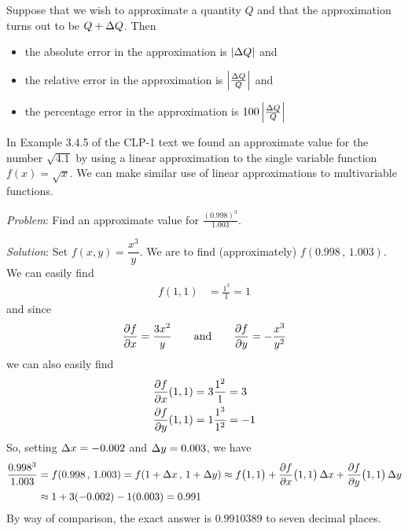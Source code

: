 \begin{defn}\label{def error}
Suppose that we wish to approximate a quantity $Q$ and that the
approximation turns out to be $Q+\Delta Q$. Then
\begin{itemize}\itemsep1pt \parskip0pt 
\item 
the absolute error in the approximation is $|\Delta Q|$ and
\item
the relative error in the approximation is $\left|\frac{\Delta Q}{Q}\right|$ and
\item
the percentage error in the approximation is
$100\left|\frac{\Delta Q}{Q}\right|$ 
\end{itemize}
\end{defn}

In Example 3.4.5 of the CLP-1 text we found an approximate
value for the number $\sqrt{4.1}$ by using a linear approximation
to the single variable function $f(x)=\sqrt{x}$. We can make similar use
of linear approximations to multivariable functions.

\begin{eg}\label{eg approx A}
\noindent\textit{Problem}:
Find an approximate value for $\frac{(0.998)^3}{1.003}$.

\medskip
\noindent\textit{Solution}:
Set $f(x,y) = \dfrac{x^3}{y}$. We are to find (approximately) 
$f(0.998\,,\,1.003)$. We can easily find
\begin{align*}
f(1,1) &= \frac{1^3}{1}=1
\end{align*}
and since 
\begin{equation*}
\pdiff{f}{x}=\frac{3x^2}{y}\qquad \text{and}\qquad 
\pdiff{f}{y}=-\frac{x^3}{y^2}
\end{equation*}
we can also easily find
\begin{align*}
\pdiff{f}{x}(1,1) &= 3\frac{1^2}{1}=3 \\
\pdiff{f}{y}(1,1) &= 1\frac{1^3}{1^2}=-1 
\end{align*}
So, setting $\Delta x=-0.002$ and $\Delta y=0.003$, we have
\begin{align*}
\frac{0.998^3}{1.003}
&=f(0.998\,,\,1.003)
=f(1+\De x\,,\,1+\De y)
\approx f\big(1,1\big) 
       + \pdiff{f}{x}\big(1,1\big)\,\De x
       + \pdiff{f}{y}\big(1,1\big)\,\De y \\
&\approx 1 +3(-0.002)-1(0.003)
=0.991
\end{align*}
By way of comparison, the exact answer is $0.9910389$ to seven decimal places.
\end{eg}


